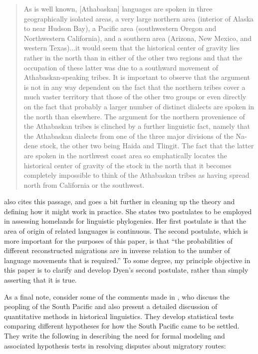 \documentclass[11pt]{article}
\begin{document}
\begin{quote}
 As is well known, [Athabaskan] languages are spoken in three geographically isolated areas, a very large northern area (interior of Alaska to near Hudson Bay), a Pacific area (southwestern Oregon and Northwestern California), and a southern area (Arizona, New Mexico, and western Texas)...it would seem that the historical center of gravity lies rather in the north than in either of the other two regions and that the occupation of these latter was due to a southward movement of Athabaskan-speaking tribes. It is important to observe that the argument is not in any way dependent on the fact that the northern tribes cover a much vaster territory that those of the other two groups or even directly on the fact that probably a larger number of distinct dialects are spoken in the north than elsewhere. The argument for the northern provenience of the Athabaskan tribes is clinched by a further linguistic fact, namely that the Athabaskan dialects from one of the three major divisions of the Na-dene stock, the other two being Haida and Tlingit. The fact that the latter are spoken in the northwest coast area so emphatically locates the historical center of gravity of the stock in the north that it becomes completely impossible to think of the Athabaskan tribes as having spread north from California or the southwest. 
\end{quote}


\citet[p. 623]{dyen56} also cites this passage, and goes a bit further in cleaning up the theory and defining how it might work  in practice. She states two postulates to be employed in assessing homelands for linguistic phylogenies. Her first postulate is that the area of origin of related languages is continuous. The second postulate, which is more important for the purposes of this paper, is that ``the probabilities of different reconstructed migrations are in inverse relation to the number of language movements that is required.'' \citep[p.613]{dyen56} 
To some degree, my principle objective in this paper is to clarify and develop Dyen's second postulate, rather than simply asserting that it is true.

As a final note, consider some of the comments made in \cite{greenhill05}, who discuss the peopling of the South Pacific and also present a detailed discussion of quantitative methods in historical linguistics. They develop statistical tests comparing different hypotheses for how the South Pacific came to be settled. They write the following in describing the need for formal modeling and associated hypothesis tests in resolving disputes about migratory routes:
\end{document}
